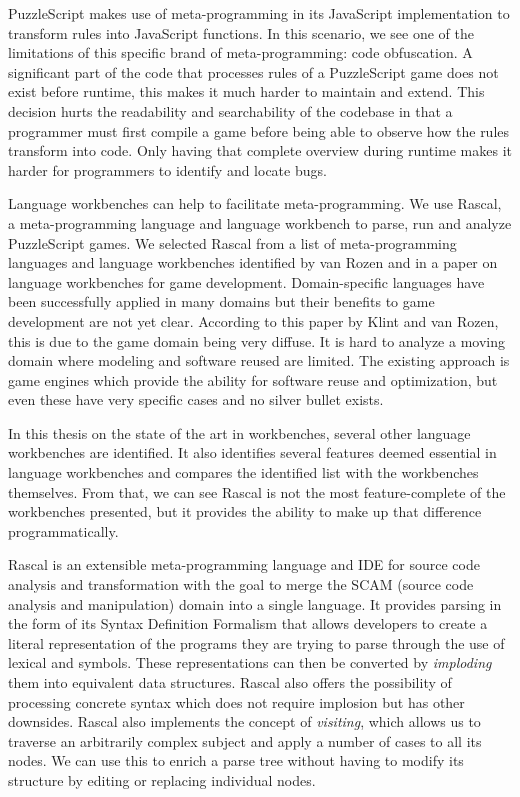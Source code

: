 PuzzleScript makes use of meta-programming in its JavaScript implementation to transform rules into JavaScript functions. In this scenario, we see one of the limitations of this specific brand of meta-programming: code obfuscation. A significant part of the code that processes rules of a PuzzleScript game does not exist before runtime, this makes it much harder to maintain and extend. This decision hurts the readability and searchability of the codebase in that a programmer must first compile a game before being able to observe how the rules transform into code. Only having that complete overview during runtime makes it harder for programmers to identify and locate bugs.

Language workbenches can help to facilitate meta-programming. We use Rascal, a meta-programming language and language workbench to parse, run and analyze PuzzleScript games. We selected Rascal from a list of meta-programming languages and language workbenches identified by van Rozen\cite{10.1145/3412843} and in a paper on language workbenches for game development\cite{10.1007/978-3-319-02654-1_3}. Domain-specific languages have been successfully applied in many domains but their benefits to game development are not yet clear. According to this paper by Klint and van Rozen\cite{10.1007/978-3-319-02654-1_3}, this is due to the game domain being very diffuse. It is hard to analyze a moving domain where modeling and software reused are limited. The existing approach is game engines which provide the ability for software reuse and optimization, but even these have very specific cases and no silver bullet exists.

In this thesis on the state of the art in workbenches, several other language workbenches are identified. It also identifies several features deemed essential in language workbenches and compares the identified list with the workbenches themselves. From that, we can see Rascal is not the most feature-complete of the workbenches presented, but it provides the ability to make up that difference programmatically. 

Rascal is an extensible meta-programming language and IDE for source code analysis and transformation with the goal to merge the SCAM (source code analysis and manipulation) domain into a single language\cite{Klint2011}. It provides parsing in the form of its Syntax Definition Formalism that allows developers to create a literal representation of the programs they are trying to parse through the use of lexical and symbols. These representations can then be converted by \textit{imploding} them into equivalent data structures. Rascal also offers the possibility of processing concrete syntax which does not require implosion but has other downsides. Rascal also implements the concept of \textit{visiting}, which allows us to traverse an arbitrarily complex subject and apply a number of cases to all its nodes. We can use this to enrich a parse tree without having to modify its structure by editing or replacing individual nodes.


